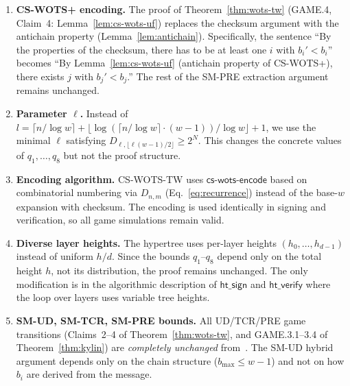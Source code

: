 \documentclass[11pt,a4paper]{article}
\newcommand{\Nbits}{N}
\begin{document}
\begin{enumerate}
    \item \textbf{CS-WOTS+ encoding.} The proof of Theorem~\ref{thm:wots-tw} (GAME.4, Claim~4: Lemma~\ref{lem:cs-wots-uf}) replaces the checksum argument with the antichain property (Lemma~\ref{lem:antichain}). Specifically, the sentence ``By the properties of the checksum, there has to be at least one $i$ with $b_i' < b_i$'' becomes ``By Lemma~\ref{lem:cs-wots-uf} (antichain property of CS-WOTS+), there exists $j$ with $b_j' < b_j$.'' The rest of the SM-PRE extraction argument remains unchanged.
    
    \item \textbf{Parameter $\ell$.} Instead of $l = \lceil n/\log w\rceil + \lfloor\log(\lceil n/\log w\rceil \cdot (w-1))/\log w\rfloor + 1$, we use the minimal $\ell$ satisfying $D_{\ell, \lfloor \ell(w-1)/2\rfloor} \ge 2^\Nbits$. This changes the concrete values of $q_1,\ldots,q_8$ but not the proof structure.
    
    \item \textbf{Encoding algorithm.} CS-WOTS-TW uses $\mathsf{cs\text{-}wots\text{-}encode}$ based on combinatorial numbering via $D_{n,m}$ (Eq.~\eqref{eq:recurrence}) instead of the base-$w$ expansion with checksum. The encoding is used identically in signing and verification, so all game simulations remain valid.
    
    \item \textbf{Diverse layer heights.} The hypertree uses per-layer heights $(h_0,\ldots,h_{d-1})$ instead of uniform $h/d$. Since the bounds $q_1$--$q_8$ depend only on the total height $h$, not its distribution, the proof remains unchanged. The only modification is in the algorithmic description of $\mathsf{ht\_sign}$ and $\mathsf{ht\_verify}$ where the loop over layers uses variable tree heights.
    
    \item \textbf{SM-UD, SM-TCR, SM-PRE bounds.} All UD/TCR/PRE game transitions (Claims~2--4 of Theorem~\ref{thm:wots-tw}, and GAME.3.1--3.4 of Theorem~\ref{thm:kylin}) are \emph{completely unchanged} from~\cite{HK22}. The SM-UD hybrid argument depends only on the chain structure ($b_{\max} \le w-1$) and not on how $b_i$ are derived from the message.
\end{enumerate}
\end{document}
